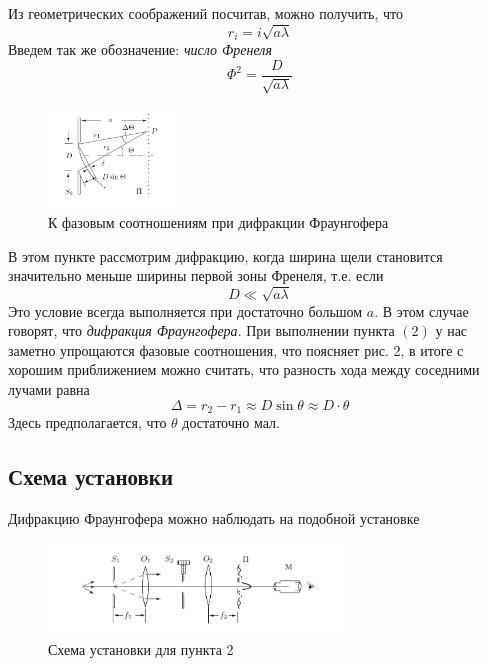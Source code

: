 Из геометрических соображений посчитав, можно получить, что 
\begin{equation}
r_i = i \sqrt{a \lambda}
\end{equation}	
Введем так же обозначение: \textit{число Френеля}
\begin{equation}
\Phi^2 = \dfrac{D}{\sqrt{a\lambda}}
\end{equation}
\begin{figure}
  \begin{center}
    \includegraphics[width = 0.3\textwidth]{3.png}
  \end{center}
  \caption{К фазовым соотношениям при дифракции Фраунгофера}
\end{figure}
В этом пункте рассмотрим дифракцию, когда ширина щели становится значительно меньше ширины первой зоны Френеля, т.е. если 
\begin{equation}
D \ll\sqrt{a \lambda} 
\end{equation}	
Это условие всегда выполняется при достаточно большом $a$. В этом случае говорят, что \textit{дифракция Фраунгофера}. При выполнении пункта $(2)$ у нас заметно упрощаются фазовые соотношения, что поясняет рис. 2, в итоге с хорошим приближением можно считать, что разность хода между соседними лучами равна 
\begin{equation}
\Delta = r_2 - r_1 \approx D \sin \theta \approx D \cdot \theta
\end{equation}
Здесь предполагается, что $\theta$ достаточно мал.

\newpage

\subsection*{Схема установки}
Дифракцию Фраунгофера можно наблюдать на подобной установке 

\begin{figure}[h]
\begin{center}
\includegraphics[width = 0.7\textwidth]{4.png}
\caption{Схема установки для пункта 2}
\end{center}
\end{figure}

